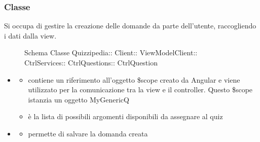 \subsubsection{Classe }
Si occupa di gestire la creazione delle domande da parte dell'utente, raccogliendo i dati dalla view.
\begin{figure}[H]
\centering
\noindent{}
\caption[Schema Classe CtrlQuestion]{Schema Classe Quizzipedia:: Client:: ViewModelClient:: CtrlServices:: CtrlQuestions:: CtrlQuestion}
\end{figure}
\begin{itemize}
\item {}
\begin{itemize}
\item {}
\newline
contiene un riferimento all'oggetto \$scope creato da Angular e viene utilizzato per la comunicazione tra la view e il controller. Questo \$scope istanzia un oggetto MyGenericQ
\item {}
\newline
è la lista di possibili argomenti disponibili da assegnare al quiz
\end{itemize}
\item {}
\begin{itemize}
\item {}
\newline
permette di salvare la domanda creata
\newline
\end{itemize}
\end{itemize}
